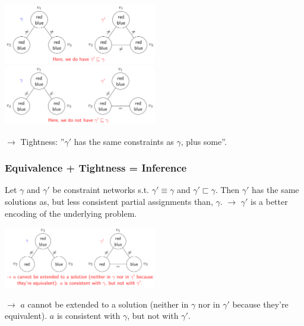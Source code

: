 \documentclass[conference]{styles/acmsiggraph}
\begin{document}
            \includegraphics[width=0.5\textwidth]{imgs/TIGHTNESS_1.png}\ \ \ \ \ \ 
            \includegraphics[width=0.5\textwidth]{imgs/TIGHTNESS_2.png}\newline
            
            $\rightarrow$ Tightness: ''$\gamma'$ has the same constraints as $\gamma$, plus some''.
            
        \subsubsection{Equivalence + Tightness = Inference}
            Let $\gamma$ and $\gamma'$ be constraint networks s.t. $\gamma' \equiv \gamma$ and $\gamma' \sqsubset \gamma$.
            Then $\gamma'$ has the same solutions as, but less consistent partial assignments than, $\gamma$.\newline
            $\rightarrow$ $\gamma'$ is a better encoding of the underlying problem.
            
            \includegraphics[width=0.5\textwidth]{imgs/Inference.png}\newline
            
            $\rightarrow$ $a$ cannot be extended to a solution (neither in $\gamma$ nor in $\gamma'$ because they're equivalent).
            $a$ is consistent with $\gamma$, but not with $\gamma'$.
    
    
    
    
    
    
\end{document}
